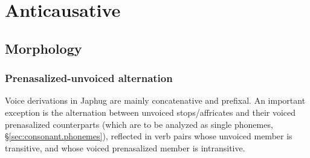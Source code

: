 \section{Anticausative} \label{sec:anticausative}

\subsection{Morphology} \label{sec:anticausative.morphology}  

\subsubsection{Prenasalized-unvoiced alternation} \label{sec:anticausative.pairs}  
  
Voice derivations in Japhug are mainly concatenative and prefixal. An important exception is the alternation between unvoiced stops/affricates and their voiced prenasalized counterparts (which are to be analyzed as single phonemes, §\ref{sec:consonant.phonemes}), reflected in verb pairs whose unvoiced member is transitive, and whose voiced prenasalized member is intransitive.
 

